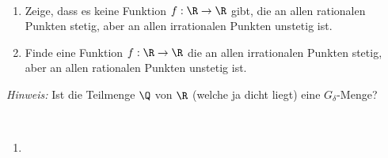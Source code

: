 \begin{exercise}
\leavevmode \\
\begin{enumerate}[label = (\roman*)]
  \item Zeige, dass es keine Funktion $f: \R \rightarrow \R$ gibt, die an allen rationalen
  Punkten stetig, aber an allen irrationalen Punkten unstetig ist.
  \item Finde eine
 Funktion $f: \R \rightarrow \R$ die an allen irrationalen Punkten stetig,
 aber an allen rationalen Punkten unstetig ist.
\end{enumerate}
\textit{Hinweis:} Ist die Teilmenge $\Q$ von $\R$ (welche ja dicht liegt)
eine $G_{\delta}$-Menge?
\end{exercise}
\begin{solution}
\leavevmode \\
\begin{enumerate}[label = (\roman*)]
  \item
\end{enumerate}
\end{solution}
